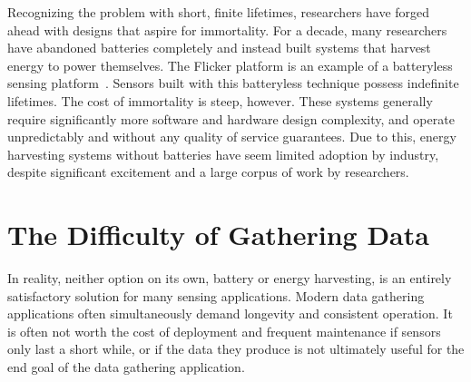 Recognizing the problem with short, finite lifetimes, researchers have forged ahead with designs that aspire for immortality. 
For a decade, many researchers have abandoned batteries completely and instead built systems that harvest energy to power themselves. 
The Flicker platform is an example of a batteryless sensing platform~\cite{hesterFlicker17}. 
Sensors built with this batteryless technique possess indefinite lifetimes. The cost of immortality is steep, however.
These systems generally require significantly more software and hardware design complexity, and operate unpredictably and without any quality of service guarantees.
Due to this, energy harvesting systems without batteries have seem limited adoption by industry, despite significant excitement and a large corpus of work by researchers. 



\section{The Difficulty of Gathering Data}
In reality, neither option on its own, battery or energy harvesting, is an entirely satisfactory solution for many sensing applications. 
Modern data gathering applications often simultaneously demand longevity and consistent operation.
It is often not worth the cost of deployment and frequent maintenance if sensors only last a short while, or if the data they produce is not ultimately useful for the end goal of the data gathering application.

